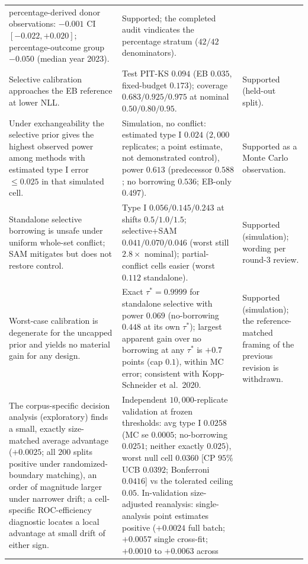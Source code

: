 \documentclass[11pt]{article}
\begin{document}
\begin{longtable}{p{} p{} p{}}
percentage-derived donor observations: $-0.001$ CI $[-0.022,+0.020]$;
percentage-outcome group $-0.050$ (median year 2023). & Supported; the
completed audit vindicates the percentage stratum ($42/42$ denominators). \\
Selective calibration approaches the EB reference at lower NLL. & Test PIT-KS
$0.094$ (EB $0.035$, fixed-budget $0.173$); coverage $0.683/0.925/0.975$ at
nominal $0.50/0.80/0.95$. & Supported (held-out split). \\
Under exchangeability the selective prior gives the highest observed power
among methods with estimated type I error $\le 0.025$ in that simulated
cell. & Simulation, no conflict: estimated type I $0.024$ ($2{,}000$
replicates; a point estimate, not demonstrated control), power
$0.613$ (predecessor $0.588$; no borrowing $0.536$; EB-only $0.497$). &
Supported as a Monte Carlo observation. \\
Standalone selective borrowing is unsafe under uniform whole-set conflict;
SAM mitigates but does not restore control. & Type I $0.056/0.145/0.243$ at
shifts $0.5/1.0/1.5$; selective+SAM $0.041/0.070/0.046$ (worst still
$2.8\times$ nominal); partial-conflict cells easier (worst $0.112$
standalone). & Supported (simulation); wording per round-3 review. \\
Worst-case calibration is degenerate for the uncapped prior and yields no
material gain for any design. & Exact $\tau^{*}=0.9999$ for standalone
selective with power $0.069$ (no-borrowing $0.448$ at its own $\tau^{*}$);
largest apparent gain over no borrowing at any $\tau^{*}$ is $+0.7$ points
(cap $0.1$), within MC error; consistent with Kopp-Schneider et al.\ 2020.
& Supported (simulation); the reference-matched framing of the previous
revision is withdrawn. \\
The corpus-specific decision analysis (exploratory) finds a small,
exactly size-matched average advantage ($+0.0025$; all $200$ splits
positive under randomized-boundary matching), an order of magnitude
larger under narrower drift; a cell-specific ROC-efficiency
diagnostic locates a local advantage at small drift of either sign. &
Independent $10{,}000$-replicate validation at frozen thresholds: avg type
I $0.0258$ (MC se $0.0005$; no-borrowing $0.0251$; neither exactly
$0.025$), worst null cell $0.0360$ [CP $95\%$ UCB $0.0392$; Bonferroni
$0.0416$] vs the tolerated ceiling $0.05$. In-validation size-adjusted
reanalysis: single-analysis point estimates positive ($+0.0024$ full
batch; $+0.0057$ single cross-fit; $+0.0010$ to $+0.0063$ across

\end{longtable}
\end{document}

